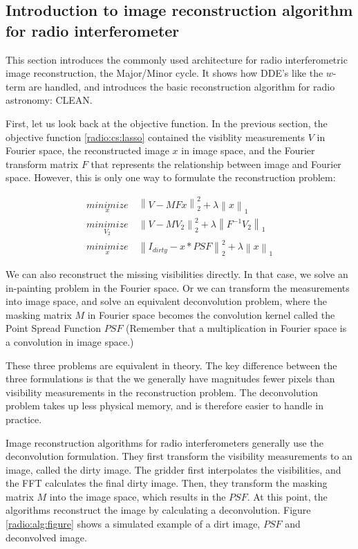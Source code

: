 \subsection{Introduction to image reconstruction algorithm for radio interferometer}\label{intro2:rec}
This section introduces the commonly used architecture for radio interferometric image reconstruction, the Major/Minor cycle. It shows how DDE's like the $w$-term are handled, and introduces the basic reconstruction algorithm for radio astronomy: CLEAN.

First, let us look back at the objective function. In the previous section, the objective function \eqref{radio:cs:lasso} contained the visiblity measurements $V$ in Fourier space, the reconstructed image $x$ in image space, and the Fourier transform matrix $F$ that represents the relationship between image and Fourier space. However, this is only one way to formulate the reconstruction problem:

\begin{equation} \label{radio:rec:objective}
\begin{split}
\underset{x}{minimize} &\: \left \| V - MFx \right \|_2^2 + \lambda \left \| x \right \|_1 \\
\underset{V_2}{minimize} &\: \left \| V - MV_2 \right \|_2^2 + \lambda \left \| F^{-1}V_2 \right \|_1 \\
\underset{x}{minimize} &\: \left \| I_{dirty} - x * PSF \right \|_2^2 + \lambda \left \| x \right \|_1
\end{split}
\end{equation}

We can also reconstruct the missing visibilities directly. In that case, we solve an in-painting problem in the Fourier space. Or we can transform the measurements into image space, and solve an equivalent deconvolution problem, where the masking matrix $M$ in Fourier space becomes the convolution kernel called the Point Spread Function $PSF$ (Remember that a multiplication in Fourier space is a convolution in image space.)

These three problems are equivalent in theory. The key difference between the three formulations is that the we generally have magnitudes fewer pixels than visibility measurements in the reconstruction problem. The deconvolution problem takes up less physical memory, and is therefore easier to handle in practice.

Image reconstruction algorithms for radio interferometers generally use the deconvolution formulation. They first transform the visibility measurements to an image, called the dirty image. The gridder first interpolates the visibilities, and the FFT calculates the final dirty image. Then, they transform the masking matrix $M$ into the image space, which results in the $PSF$. At this point, the algorithms reconstruct the image by calculating a deconvolution. Figure \ref{radio:alg:figure} shows a simulated example of a dirt image, $PSF$ and deconvolved image.

